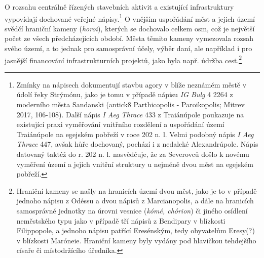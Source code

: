 O rozsahu centrálně řízených stavebních aktivit a existující infrastruktury vypovídají dochované veřejné nápisy.\footnote{Zmínky na nápisech dokumentují stavbu agory v blíže neznámém městě v údolí řeky Strýmónu, jako je tomu v případě nápisu {\em IG Bulg} 4 2264 z moderního města Sandanski (antick8 Parthicopolis - Paroikopolis; Mitrev 2017, 106-108). Další nápis {\em I Aeg Thrace} 433 z Traiánúpole poukazuje na existující praxi vyměřování vnitřního rozdělení a uspořádání území Traiánúpole na egejském pobřeží v roce 202 n. l. Velmi podobný nápis {\em I Aeg Thrace} 447, avšak hůře dochovaný, pochází i z nedaleké Alexandrúpole. Nápis datovaný taktéž do r. 202 n. l. nasvědčuje, že za Severovců došlo k novému vyměření území a jejich vnitřní struktury u nejméně dvou měst na egejském pobřeží.} O vnějším uspořádání měst a jejich území svědčí hraniční kameny ({\em horoi}), kterých se dochovalo celkem osm, což je největší počet ze všech předcházejících období. Města těmito kameny vymezovala rozsah svého území, a to jednak pro samosprávní účely, výběr daní, ale například i pro jasnější financování infrastrukturních projektů, jako byla např. údržba cest.\footnote{Hraniční kameny se našly na hranicích území dvou měst, jako je to v případě jednoho nápisu z Odéssu a dvou nápisů z Marcianopolis, a dále na hranicích samosprávné jednotky na úrovni vesnice ({\em kómé, chórion}) či jiného osídlení neměstského typu jako v případě tří nápisů z Bendipary v blízkosti Filippopole, a jednoho nápisu patřící Eresénským, tedy obyvatelům Eresy(?) v blízkosti Maróneie. Hraniční kameny byly vydány pod hlavičkou tehdejšího císaře či místodržícího úředníka.}

